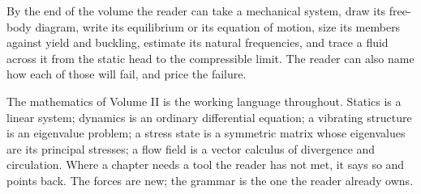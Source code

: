 By the end of the volume the reader can take a mechanical system, draw
its free-body diagram, write its equilibrium or its equation of motion,
size its members against yield and buckling, estimate its natural
frequencies, and trace a fluid across it from the static head to the
compressible limit. The reader can also name how each of those will
fail, and price the failure.

The mathematics of Volume II is the working language throughout. Statics
is a linear system; dynamics is an ordinary differential equation; a
vibrating structure is an eigenvalue problem; a stress state is a
symmetric matrix whose eigenvalues are its principal stresses; a flow
field is a vector calculus of divergence and circulation. Where a
chapter needs a tool the reader has not met, it says so and points back.
The forces are new; the grammar is the one the reader already owns.

\vspace{1cm}
